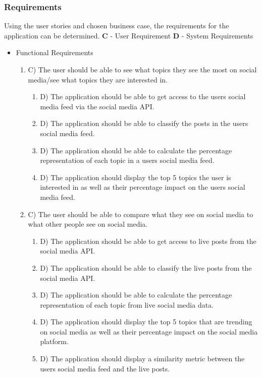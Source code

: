 \subsubsection{Requirements}\label{sec:requirements}
Using the user stories and chosen business case, the requirements for the application can be determined. \textbf{C} - User Requirement
\textbf{D} - System Requirements
\begin{itemize}
    \item Functional Requirements
    \begin{enumerate}
        \item C) The user should be able to see what topics they see the most on social media/see what topics they are interested in.
        \begin{enumerate}
            \item D) The application should be able to get access to the users social media feed via the social media API.
            \item D) The application should be able to classify the posts in the users social media feed.
            \item D) The application should be able to calculate the percentage representation of each topic in a users social media feed.
            \item D) The application should display the top 5 topics the user is interested in as well as their percentage impact on the users social media feed.
        \end{enumerate}
        \item C) The user should be able to compare what they see on social media to what other people see on social media.
        \begin{enumerate}
            \item D) The application should be able to get access to live posts from the social media API.
            \item D) The application should be able to classify the live posts from the social media API.
            \item D) The application should be able to calculate the percentage representation of each topic from live social media data.
            \item D) The application should display the top 5 topics that are trending on social media as well as their percentage impact on the social media platform.
            \item D) The application should display a similarity metric between the users social media feed and the live posts.

\end{enumerate}
\end{enumerate}
\end{itemize}
